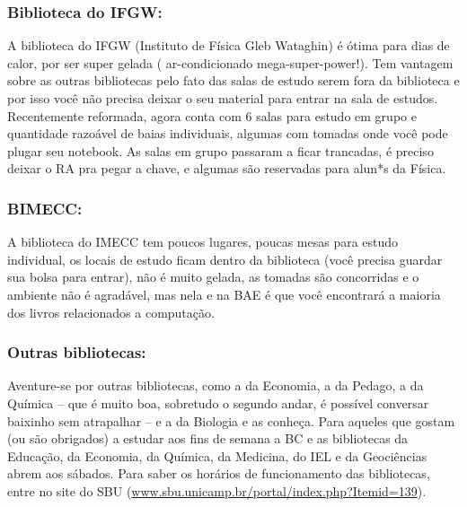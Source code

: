 \subsubsection{Biblioteca do IFGW:} A biblioteca do IFGW (Instituto de Física
Gleb Wataghin) é ótima para dias de calor, por ser super gelada (
ar-condicionado mega-super-power!). Tem vantagem sobre as outras bibliotecas
pelo fato das salas de estudo serem fora da biblioteca e por isso você não
precisa deixar o seu material para entrar na sala de estudos. Recentemente
reformada, agora conta com 6 salas para estudo em grupo e quantidade razoável
de baias individuais, algumas com tomadas onde você pode plugar seu notebook.
As salas em grupo passaram a ficar trancadas, é preciso deixar o RA pra pegar a
chave, e algumas são reservadas para alun*s da Física.

\subsubsection{BIMECC:} A biblioteca do IMECC tem poucos lugares, poucas mesas
para estudo individual, os locais de estudo ficam dentro da biblioteca (você
precisa guardar sua bolsa para entrar), não é muito gelada, as tomadas são
concorridas e o ambiente não é agradável, mas nela e na BAE é que você
encontrará a maioria dos livros relacionados a computação.

\subsubsection{Outras bibliotecas:} Aventure-se por outras bibliotecas, como a
da Economia, a da Pedago, a da Química -- que é muito boa, sobretudo o segundo
andar, é possível conversar baixinho sem atrapalhar -- e a da Biologia e as
conheça. Para aqueles que gostam (ou são obrigados) a estudar aos fins de
semana a BC e as bibliotecas da Educação, da Economia, da Química, da Medicina,
do IEL e da Geociências abrem aos sábados. Para saber os horários de
funcionamento das bibliotecas, entre no site do SBU
(\url{www.sbu.unicamp.br/portal/index.php?Itemid=139}).



